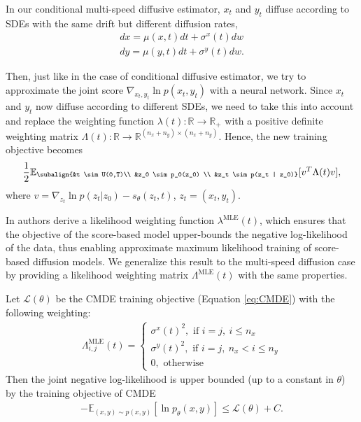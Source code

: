 In our conditional multi-speed diffusive estimator, $x_t$ and $y_t$ diffuse according to SDEs with the same drift but different diffusion rates,
\begin{gather*}
    dx = \mu(x,t)dt+\sigma^x(t)dw  \\
    dy = \mu(y,t)dt+\sigma^y(t)dw.
\end{gather*}


Then, just like in the case of conditional diffusive estimator, we try to approximate the joint score $\nabla_{x_t, y_t} \ln p(x_t, y_t)$ with a neural network. Since $x_t$ and $y_t$ now diffuse according to different SDEs, we need to take this into account and replace the weighting function $\lambda(t):\mathbb{R} \xrightarrow{} \mathbb{R}_+ $ with a positive definite weighting matrix $\Lambda(t): \mathbb{R} \xrightarrow{} \mathbb{R}^{(n_x + n_y) \times (n_x + n_y)}$. Hence, the new training objective becomes
\begin{gather}
    \label{eq:CMDE}
    \begin{aligned}
        \frac{1}{2} \mathbb{E}_{\subalign{&t \sim U(0,T)\\ &z_0 \sim p_0(z_0) \\ &z_t \sim p(z_t | z_0)}} 
        [
            v^T \Lambda(t) v
        ],
    \end{aligned}
\end{gather}
where $v=\nabla_{z_t} \ln{p(z_t |z_0)} - s_\theta(z_t,t)$, $z_t=(x_t,y_t)$.

In \cite{song2021maximum} authors derive a likelihood weighting function $\lambda^{\text{MLE}}(t)$, which ensures that the objective of the score-based model upper-bounds the negative log-likelihood of the data, thus enabling approximate maximum likelihood training of score-based diffusion models. We generalize this result to the multi-speed diffusion case by providing a likelihood weighting matrix $\Lambda^{\text{MLE}}(t)$ with the same properties.

\begin{theorem}
    \label{thm:weightning}
    Let $\mathcal{L}(\theta)$ be the CMDE training objective (Equation \ref{eq:CMDE}) with the following weighting:
    \begin{gather*}
        \Lambda^{\text{MLE}}_{i,j}(t) =  
        \begin{cases} 
            \sigma^x(t)^2, \text{ if } i=j, \ i \leq n_x \\ 
            \sigma^y(t)^2, \text{ if } i=j, \ n_x < i \leq n_y  \\
            0, \text{ otherwise}
        \end{cases}            
    \end{gather*}
    Then the joint negative log-likelihood is upper bounded (up to a constant in $\theta$) by the training objective of CMDE
    \begin{gather*}
        -\mathbb{E}_{(x,y) \sim p(x,y)}[\ln p_\theta(x,y)] \leq \mathcal{L}(\theta) + C.
    \end{gather*}
\noindent
\end{theorem}

